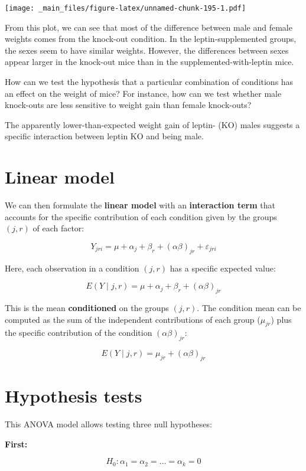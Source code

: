 \documentclass[
]{book}
\begin{document}
\texttt{[image: \_main\_files/figure-latex/unnamed-chunk-195-1.pdf]}

From this plot, we can see that most of the difference between male and female weights comes from the knock-out condition. In the leptin-supplemented groups, the sexes seem to have similar weights. However, the differences between sexes appear larger in the knock-out mice than in the supplemented-with-leptin mice.

How can we test the hypothesis that a particular combination of conditions has an effect on the weight of mice? For instance, how can we test whether male knock-outs are less sensitive to weight gain than female knock-outs?

The apparently lower-than-expected weight gain of leptin- (KO) males suggests a specific interaction between leptin KO and being male.

\hypertarget{linear-model-1}{%
\section{Linear model}\label{linear-model-1}}

We can then formulate the \textbf{linear model} with an \textbf{interaction term} that accounts for the specific contribution of each condition given by the groups \((j,r)\) of each factor:

\[
Y_{jri} = \mu + \alpha_j + \beta_r + (\alpha\beta)_{jr} + \varepsilon_{jri}
\]

Here, each observation in a condition \((j,r)\) has a specific expected value:

\[
E(Y \mid j,r) = \mu + \alpha_j + \beta_r + (\alpha\beta)_{jr}
\]

This is the mean \textbf{conditioned} on the groups \((j,r)\). The condition mean can be computed as the sum of the independent contributions of each group (\(\mu_{jr}\)) plus the specific contribution of the condition \((\alpha\beta)_{jr}\):

\[
E(Y \mid j,r) = \mu_{jr} + (\alpha\beta)_{jr}
\]

\hypertarget{hypothesis-tests-1}{%
\section{Hypothesis tests}\label{hypothesis-tests-1}}

This ANOVA model allows testing three null hypotheses:

\textbf{First:}

\[
H_0: \alpha_1 = \alpha_2 = \dots = \alpha_k = 0
\]
\end{document}
